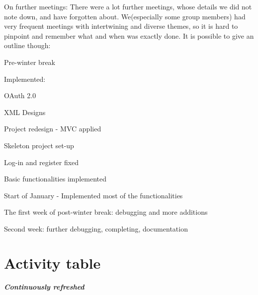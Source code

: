 \begin{packed_enum}
			\item On further meetings: There were a lot further meetings, whose details we did not note down, and have forgotten about. We(especially some group members) had very frequent meetings with intertwining and diverse themes, so it is hard to pinpoint and remember what and when was exactly done. It is possible to give an outline though:
			
			\item Pre-winter break
			\item Implemented:
			\item[] \begin{packed_enum}
				\item OAuth 2.0
				\item XML Designs
				\item Project redesign - MVC applied
				\item Skeleton project set-up
				\item Log-in and register fixed
				\item Basic functionalities implemented
			\end{packed_enum}
			
			\item Start of January - Implemented most of the functionalities
			
			\item The first week of post-winter break: debugging and more additions
			\item Second week: further debugging, completing, documentation
			
		\end{packed_enum}
		
		\eject
		\section*{Activity table}
		
			\textbf{\textit{Continuously refreshed}}\\
	
